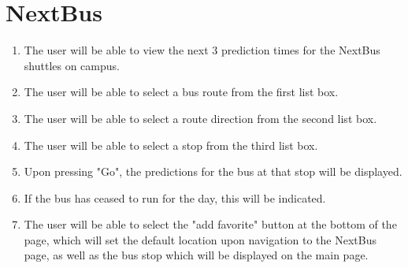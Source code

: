 \documentclass[pdftex,12pt,letter]{article}
\begin{document}
\section{NextBus}
\begin{enumerate}[1.]
\item The user will be able to view the next 3 prediction times for the NextBus shuttles on campus.
\item The user will be able to select a bus route from the first list box.
\item The user will be able to select a route direction from the second list box.
\item The user will be able to select a stop from the third list box.
\item Upon pressing "Go", the predictions for the bus at that stop will be displayed.
\item If the bus has ceased to run for the day, this will be indicated.
\item The user will be able to select the "add favorite" button at the bottom of the page, which will set the default location upon navigation to the NextBus page, as well as the bus stop which will be displayed on the main page.
\end{enumerate}
\end{document}
